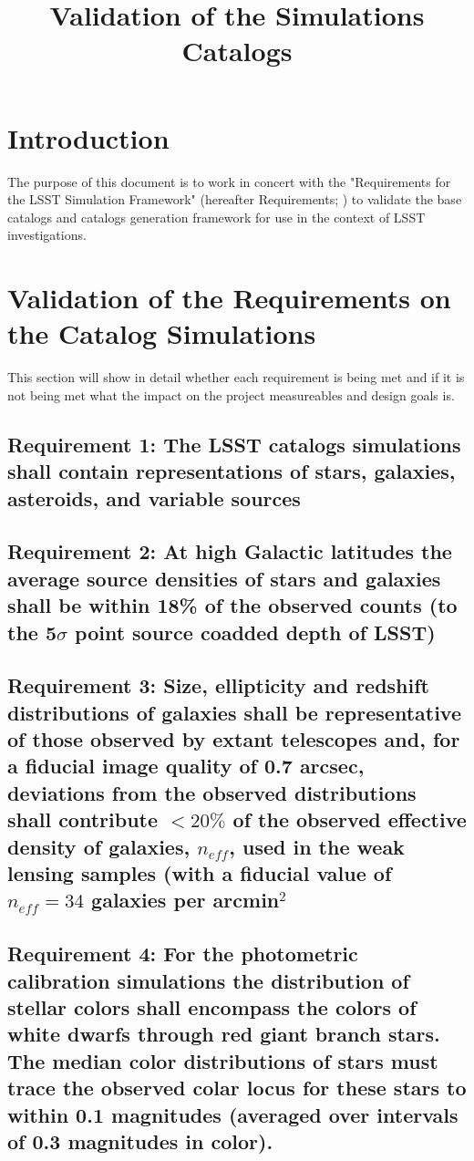 \documentclass[]{article}
\begin{document}
 
\sloppy
\title
{Validation of the Simulations Catalogs}


\label{firstpage}


\maketitle 
\section{Introduction \label{sec:intro}}
The purpose of this document is to work in concert with the "Requirements for the 
LSST Simulation Framework" (hereafter Requirements; \cite{requirements}) to validate the
base catalogs and catalogs generation framework for use in the context of
LSST investigations. 
\section{Validation of the Requirements on the Catalog Simulations}
This section will show in detail whether each requirement is being met and if it is not
being met what the impact on the project measureables and design goals is.
\subsection{Requirement 1: The LSST catalogs simulations shall contain representations of stars,
galaxies, asteroids, and variable sources}
\subsection{Requirement 2: At high Galactic latitudes the average source densities of stars and galaxies
shall be within 18\% of the observed counts (to the 5$\sigma$ point source coadded depth of LSST)}
\subsection{Requirement 3: Size, ellipticity and redshift distributions of galaxies shall be representative of those observed by extant
telescopes and, for a fiducial image quality of 0.7 arcsec, deviations from the observed distributions shall
contribute $< 20\%$ of the observed effective density of galaxies, $n_{eff}$, used in the weak lensing samples (with a fiducial value of
$n_{eff} = 34$ galaxies per arcmin$^2$}
\subsection{Requirement 4: For the photometric calibration simulations
the distribution of stellar colors shall encompass the colors of white dwarfs through red giant branch stars.
The median color distributions of stars must trace the observed colar locus for these stars to within 0.1 magnitudes
(averaged over intervals of 0.3 magnitudes in color).}
\end{document}
